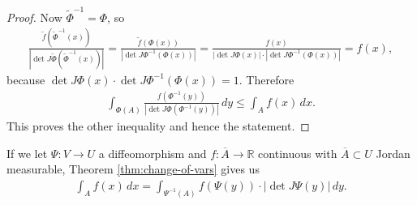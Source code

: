 \begin{proof}
	Now $\tilde{\Phi}^{-1} = \Phi$, so
	\begin{align*}
		\frac{\tilde{f}(\tilde{\Phi}^{-1}(x))}{\left|\det J\tilde{\Phi}(\tilde{\Phi}^{-1}(x))\right|}
		= \frac{\tilde{f}(\Phi(x))}{\left|\det J\Phi^{-1}(\Phi(x))\right|}
		= \frac{f(x)}{\left|\det J\Phi(x)\right| \cdot \left|\det J\Phi^{-1}(\Phi(x))\right|}
		= f(x),
	\end{align*}
	because $\det J\Phi(x) \cdot \det J\Phi^{-1}(\Phi(x)) = 1$.	Therefore
	\begin{align*}
		\int_{\Phi(A)} \frac{f(\Phi^{-1}(y))}{\left|\det J\Phi(\Phi^{-1}(y))\right|} \, dy
		\le \int_A f(x) \, dx.
	\end{align*}
	This proves the other inequality and hence the statement.
\end{proof}

\begin{remark}
	If we let $\Psi: V \to U$ a diffeomorphism and $f: \overline{ A } \to \mathbb{R}$ continuous with $\overline{ A } \subset U$ Jordan measurable, Theorem \ref{thm:change-of-vars} gives us
	\begin{align*}
		\int_{A} f(x) \, dx = \int_{\Psi^{-1}(A)} f(\Psi(y)) \cdot \left| \det J \Psi(y) \right| \, dy.
	\end{align*}
\end{remark}


